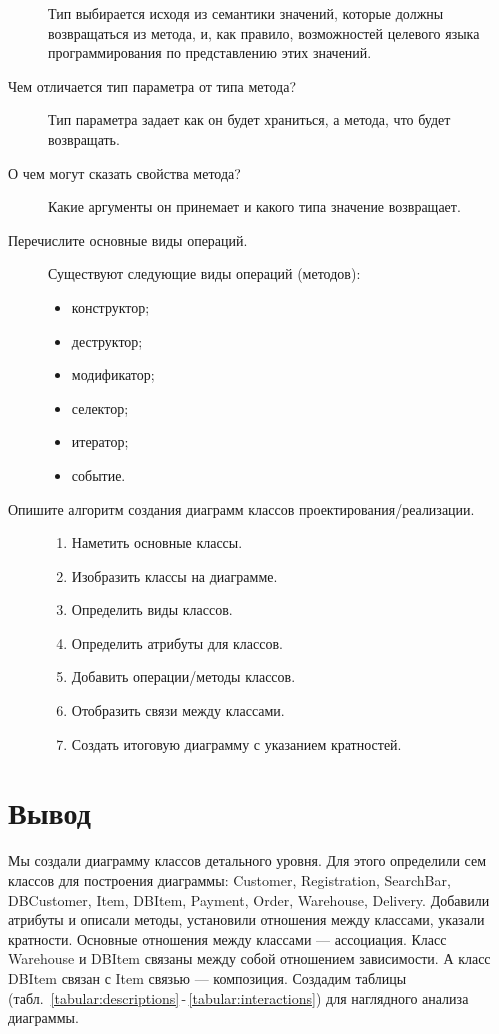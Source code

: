 \begin{description}
		Тип выбирается исходя из семантики значений, которые должны
		возвращаться из метода, и, как правило, возможностей
		целевого языка программирования по представлению этих значений.
	\item [Чем отличается тип параметра от типа метода?]
		Тип параметра задает как он будет храниться, а метода, что будет
		возвращать.
	\item [О чем могут сказать свойства метода?]
		Какие аргументы он принемает и какого типа значение возвращает.
	\item [Перечислите основные виды операций.]
		Существуют следующие виды операций (методов):
		\begin{itemize}
			\item конструктор;
			\item деструктор;
			\item модификатор;
			\item селектор;
			\item итератор;
			\item событие.
		\end{itemize}
	\item [Опишите алгоритм создания диаграмм классов
		проектирования/реализации.]
		\begin{enumerate}
			\item Наметить основные классы.
			\item Изобразить классы на диаграмме.
			\item Определить виды классов.
			\item Определить атрибуты для классов.
			\item Добавить операции/методы классов.
			\item Отобразить связи между классами.
			\item Создать итоговую диаграмму с указанием кратностей.
		\end{enumerate}

\end{description}

\clearpage

\section*{\LARGE Вывод}
Мы создали диаграмму классов детального уровня.
Для этого определили сем классов для построения диаграммы: Customer,
Registration, SearchBar, DBCustomer, Item, DBItem, Payment, Order, Warehouse,
Delivery. Добавили атрибуты и описали методы, установили отношения между
классами, указали кратности.
Основные отношения между классами --- ассоциация. Класс Warehouse и
DBItem связаны между собой отношением зависимости.
А класс DBItem связан с Item связью --- композиция. Создадим таблицы
(табл.~\ref{tabular:descriptions}\,-\,\ref{tabular:interactions})
для наглядного анализа диаграммы.


